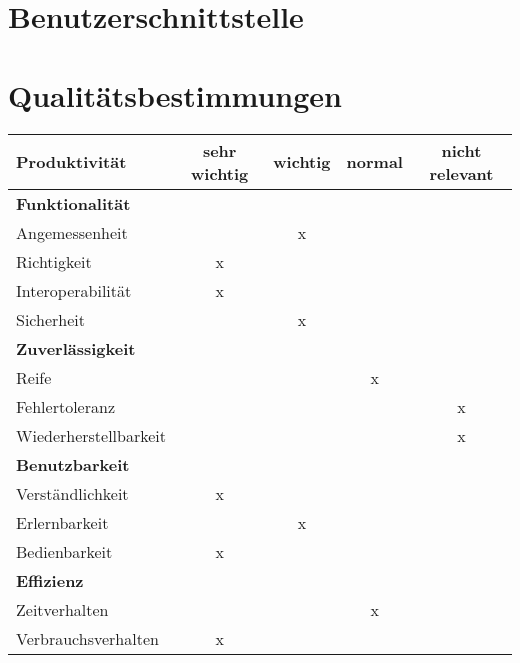 \documentclass[parskip=full,11pt]{scrartcl}
\begin{document}
\section{Benutzerschnittstelle}

\section{Qualitätsbestimmungen}

\renewcommand{\arraystretch}{1.5}
\begin{table}[H]
  \begin{center}
    \begin{tabularx}{\textwidth}{X c c c c}
      \hline
      
      \textbf{{\large Produktivität}} & \textbf{{\large sehr wichtig}} & \textbf{{\large wichtig}} & \textbf{{\large normal} } &\textbf{{\large nicht relevant }}\\
      
      \hline      
      \multicolumn{5}{l}{\textbf{Funktionalität}}\\      
      \hline      
      Angemessenheit &   & x &   &  \\
	  Richtigkeit & x &   &   &  \\
	  Interoperabilität & x &   &   &  \\
      Sicherheit &   & x &   &  \\	
		    
	  \hline	  
      \multicolumn{5}{l}{\textbf{Zuverlässigkeit}}\\     
      \hline
      Reife &   &   & x &  \\
	  Fehlertoleranz &   &   &   & x\\
	  Wiederherstellbarkeit &   &   &   & x\\
		
	  \hline	  	
	  \multicolumn{5}{l}{\textbf{Benutzbarkeit}}\\
      \hline
      Verständlichkeit & x &   &   &  \\
	  Erlernbarkeit &   & x &   &  \\
	  Bedienbarkeit & x &   &   &  \\
	  
	  \hline	  	
	  \multicolumn{5}{l}{\textbf{Effizienz}}\\
      \hline
      Zeitverhalten &   &   & x &  \\
	  Verbrauchsverhalten & x &   &   &  \\	
	  

\end{tabularx}
\end{center}
\end{table}
\end{document}
